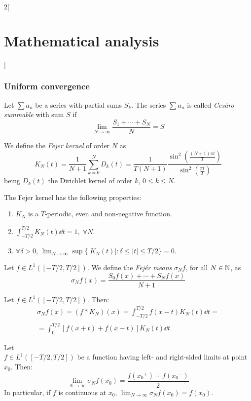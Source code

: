 \documentclass[../../../main.tex]{subfiles}
\begin{document}
\begin{multicols}{2}[\section{Mathematical analysis}]
  \subsubsection{Uniform convergence}
  \begin{definition}
    Let $\sum a_n$ be a series with partial sums $S_k$. The series $\sum a_n$ is called \emph{Cesàro summable} with sum $S$ if $$\lim_{N\to\infty}\frac{S_1+\cdots+S_N}{N}=S$$
  \end{definition}
  \begin{definition}
    We define the \emph{Fejer kernel} of order $N$ as $$K_N(t)=\frac{1}{N+1}\sum_{k=0}^ND_k(t)=\frac{1}{T(N+1)}\frac{\sin^2\left(\frac{(N+1)\pi t}{T}\right)}{\sin^2\left(\frac{\pi t}{T}\right)}$$ being $D_k(t)$ the Dirichlet kernel of order $k$, $0\leq k\leq N$.
  \end{definition}
  \begin{proposition}
    The Fejer kernel has the following properties:
    \begin{enumerate}
      \item $K_N$ is a $T$-periodic, even and non-negative function.
      \item $\displaystyle\int_{-T/2}^{T/2}K_N(t)\dd{t}=1,\;\forall N$.
      \item $\forall\delta>0$, $\displaystyle\lim_{N\to\infty}\sup\{|K_N(t)|:\delta\leq|t|\leq T/2\}=0$.
    \end{enumerate}
  \end{proposition}
  \begin{definition}
    Let $f\in L^1([-T/2,T/2])$. We define the \emph{Fejér means} $\sigma_Nf$, for all $N\in\mathbb{N} $, as $$\sigma_Nf(x)=\frac{S_0f(x)+\cdots+S_Nf(x)}{N+1}$$
  \end{definition}
  \begin{proposition}
    Let $f\in L^1([-T/2,T/2])$. Then:
    \begin{multline*}
      \sigma_Nf(x)=(f*K_N)(x)=\int_{-T/2}^{T/2}f(x-t)K_N(t)\dd{t}=\\=\int_0^{T/2}[f(x+t)+f(x-t)]K_N(t)\dd{t}
    \end{multline*}
  \end{proposition}
  \begin{theorem}
    Let \\$f\in L^1([-T/2,T/2])$ be a function having left- and right-sided limits at point $x_0$. Then: $$\lim_{N\to\infty}\sigma_Nf(x_0)=\frac{f({x_0}^+)+f({x_0}^-)}{2}$$ In particular, if $f$ is continuous at $x_0$, $\displaystyle\lim_{N\to\infty}\sigma_Nf(x_0)=f(x_0).$

\end{theorem}
\end{multicols}
\end{document}
